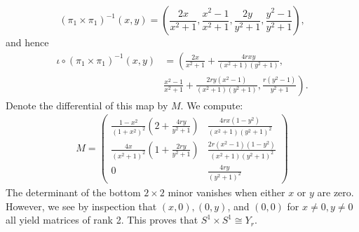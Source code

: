 \documentclass{../mathnotes}
\begin{document}
\begin{enumerate}[(a)]
        \[(\pi_1\times\pi_1)^{-1}(x,y)=\left( \frac{2x}{x^2+1},\frac{x^2-1}{x^2+1},\frac{2y}{y^2+1},\frac{y^2-1}{y^2+1} \right),\]
        and hence
        \begin{align*}
        \iota\circ(\pi_1\times\pi_1)^{-1}(x,y)&=\left( \frac{2x}{x^2+1}+\frac{4rxy}{(x^2+1)(y^2+1)},\right.\\ &\left.\frac{x^2-1}{x^2+1}+\frac{2ry(x^2-1)}{(x^2+1)(y^2+1)},\frac{r(y^2-1)}{y^2+1} \right).
        \end{align*}
        Denote the differential of this map by $M$. We compute:
        \begin{align*}
            M=
            \begin{pmatrix}
                \frac{1-x^2}{(1+x^2)^2}\left( 2+\frac{4ry}{y^2+1} \right)&\frac{4rx(1-y^2)}{(x^2+1)(y^2+1)^2}\\
                \frac{4x}{(x^2+1)^2}\left( 1+\frac{2ry}{y^2+1} \right)&\frac{2r(x^2-1)(1-y^2)}{(x^2+1)(y^2+1)^2}\\
                0&\frac{4ry}{(y^2+1)^2}
            \end{pmatrix}
        \end{align*}
        The determinant of the bottom $2\times 2$ minor vanishes when either $x$ or $y$ are zero. However,
        we see by inspection that $(x,0),(0,y)$, and $(0,0)$ for $x\neq0,y\neq0$ all yield matrices of rank 2.
        This proves that $S^1\times S^1\cong Y_r$.
\end{enumerate}
\end{document}
